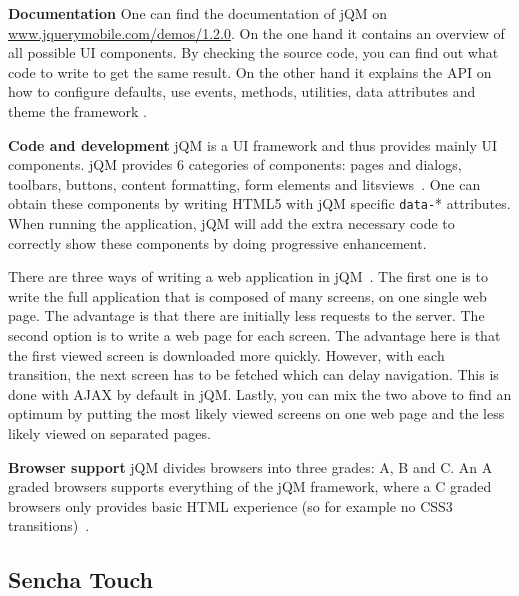 \documentclass[a4paper]{artikel3}
\newcommand{\code}[1]{\texttt{#1}}
\renewcommand{\url}[1]{\href{http://#1}{#1}}
\renewcommand{\paragraph}[1]{{\bf #1} }
\begin{document}
\paragraph{Documentation}
One can find the documentation of jQM on \url{www.jquerymobile.com/demos/1.2.0}. On the one hand it contains an overview of all possible UI components. 
By checking the source code, you can find out what code to write to get the same result. 
On the other hand it explains the API on how to configure defaults, use events, methods, utilities, data attributes and theme the framework \cite{JQuery2012b}.

\paragraph{Code and development}
jQM is a UI framework and thus provides mainly UI components. 
jQM provides 6 categories of components: pages and dialogs, toolbars, buttons, content formatting, form elements and litsviews~\cite{JQuery2012b}. 
One can obtain these components by writing HTML5 with jQM specific \code{data-}* attributes. 
When running the application, jQM will add the extra necessary code to correctly show these components by doing progressive enhancement.

There are three ways of writing a web application in jQM~\cite{Broulik2012}. 
The first one is to write the full application that is composed of many screens, on one single web page.
The advantage is that there are initially less requests to the server.
The second option is to write a web page for each screen. 
The advantage here is that the first viewed screen is downloaded more quickly. 
However, with each transition, the next screen has to be fetched which can delay navigation.
This is done with AJAX by default in jQM.
Lastly, you can mix the two above to find an optimum by putting the most likely viewed screens on one web page and the less likely viewed on separated pages.  

\paragraph{Browser support}
\label{sec:jqm-browser-support}
jQM divides browsers into three grades: A, B and C. 
An A graded browsers supports everything of the jQM framework, where a C graded browsers only provides basic HTML experience (so for example no CSS3 transitions)~\cite{JQuery2012d}.

\subsection{Sencha Touch} %
\label{sec:sencha_touch}
\end{document}
